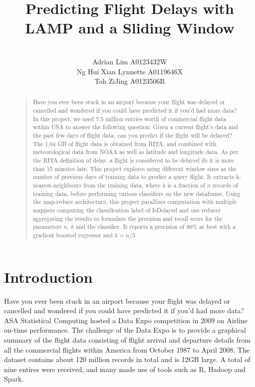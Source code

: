 \documentclass[letterpaper,11pt]{article}
\begin{document}
\title{Predicting Flight Delays with LAMP and a Sliding Window}
\author{\\Adrian Lim A0123432W \\
Ng Hui Xian Lynnette A0119646X \\
Toh ZiJing A0123506R }
\maketitle
\begin{abstract}
\begin{quote}
Have you ever been stuck in an airport because your flight was delayed or cancelled and wondered if you could have predicted it if you'd had more data? In this project, we used 7.5 million entries worth of commercial flight data within USA to answer the following question: Given a current flight's data and the past few days of flight data, can you predict if the flight will be delayed? The 1.04 GB of flight data is obtained from RITA, and combined with meteorological data from NOAA as well as latitude and longitude data. As per the RITA definition of delay, a flight is considered to be delayed ifs it is more than 15 minutes late. This project explores using different window sizes as the number of previous days of training data to predict a query flight. It extracts k-nearest-neighbours from the training data, where $k$ is a fraction of $n$ records of training data, before performing various classifiers on the new dataframe. Using the map-reduce architecture, this project parallizes computation with multiple mappers computing the classification label of IsDelayed and one reducer aggregating the results to formulate the precision and recall score for the parameters $n$, $k$ and the classifier. It reports a precision of 90\% at best with a gradient boosted regressor and $k=n/3$
\end{quote}
\end{abstract}

\section{Introduction}
Have you ever been stuck in an airport because your flight was delayed or cancelled and wondered if you could have predicted it if you'd had more data? ASA Statistical Computing hosted a Data Expo competition in 2009 \cite{asa_stat} on Airline on-time performance. The challenge of the Data Expo is to provide a graphical summary of the flight data consisting of flight arrival and departure details from all the commercial flights within America from October 1987 to April 2008. The dataset contains about 120 million records in total and is 12GB large. A total of nine entires were received, and many made use of tools such as R, Hadoop and Spark.
\end{document}
